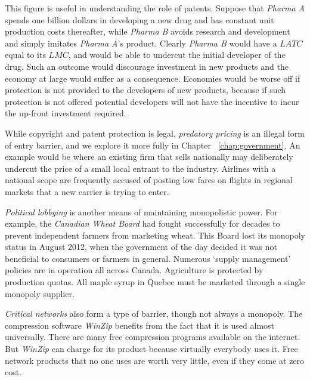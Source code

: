 

\newhtmlpage

This figure is useful in understanding the role of patents. Suppose that 
\textit{Pharma A} spends one billion dollars in developing a new drug and
has constant unit production costs thereafter, while \textit{Pharma B}
avoids research and development and simply imitates \textit{Pharma A}'s
product. Clearly \textit{Pharma B} would have a $LATC$ equal to its $LMC$,
and would be able to undercut the initial developer of the drug. Such an
outcome would discourage investment in new products and the economy at large
would suffer as a consequence. Economies would be worse off if protection is
not provided to the developers of new products, because if such protection
is not offered potential developers will not have the incentive to incur the
up-front investment required.

While copyright and patent protection is legal, \textit{predatory pricing}
is an illegal form of entry barrier, and we explore it more fully in Chapter~%
\ref{chap:government}. An example would be where an existing firm that sells
nationally may deliberately undercut the price of a small local entrant
to the industry. Airlines with a national scope are frequently accused of
posting low fares on flights in regional markets that a new carrier is
trying to enter.

\textit{Political lobbying} is another means of maintaining monopolistic
power. For example, the \textit{Canadian Wheat Board} had fought
successfully for decades to prevent independent farmers from marketing
wheat. This Board lost its monopoly status in August 2012, when the
government of the day decided it was not beneficial to consumers or farmers
in general. Numerous `supply management' policies are in operation all
across Canada. Agriculture is protected by production quotas. All maple
syrup in Quebec must be marketed through a single monopoly supplier.

\textit{Critical networks} also form a type of barrier, though not always a
monopoly. The compression software \textit{WinZip} benefits from the fact
that it is used almost universally. There are many free compression programs
available on the internet. But \textit{WinZip} can charge for its product
because virtually everybody uses it. Free network products that no one uses
are worth very little, even if they come at zero cost.